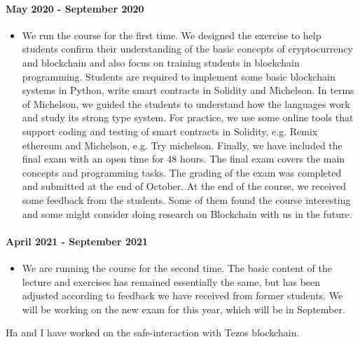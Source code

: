 \documentclass[a4paper,11pt]{article}
\begin{document}
\paragraph{May 2020 - September 2020}
\begin{itemize}
\item We run the course for the first time. We designed the exercise to help students confirm their understanding of the basic concepts of cryptocurrency and blockchain and also focus on training students in blockchain programming. Students are required to implement some basic blockchain systems in Python, write smart contracts in Solidity and Michelson. In terms of Michelson, we guided the students to understand how the languages work and study its strong type system. For practice, we use some online tools that support coding and testing of smart contracts in Solidity, e.g. Remix ethereum and Michelson, e.g. Try michelson. Finally, we have included the final exam with an open time for 48 hours. The final exam covers the main concepts and programming tasks. The grading of the exam was completed and submitted at the end of October. At the end of the course, we received some feedback from the students. Some of them found the course interesting and some might consider doing research on Blockchain with us in the future.
\end{itemize}

\paragraph{April 2021 - September 2021}
\begin{itemize} 
\item We are running the course for the second time. The basic content of the lecture and exercises has remained essentially the same, but has been adjusted according to feedback we have received from former students. We will be working on the new exam for this year, which will be in September.
\end{itemize}



Ha and I have worked on the safe-interaction with Tezos blockchain.
\end{document}
